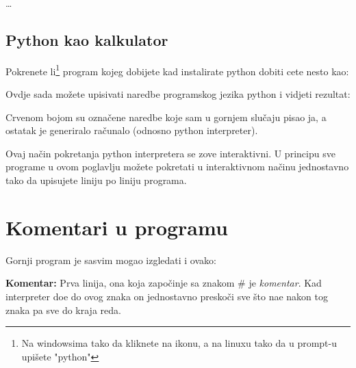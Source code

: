 \dots

\subsection{Python kao kalkulator}

Pokrenete li\footnote{Na windowsima tako da kliknete na ikonu, a
na linuxu tako da u prompt-u upi\v{s}ete "python"} program kojeg
dobijete kad instalirate python dobiti cete nesto kao:


Ovdje sada  mo\v{z}ete upisivati naredbe programskog jezika python i
vidjeti rezultat:


Crvenom bojom su ozna\v{c}ene naredbe koje sam u gornjem slu\v{c}aju
pisao ja, a ostatak je generiralo ra\v{c}unalo (odnosno python
interpreter).

Ovaj na\v{c}in pokretanja python interpretera se zove interaktivni. U
principu sve programe u ovom poglavlju mo\v{z}ete pokretati u interaktivnom
na\v{c}inu jednostavno tako da upisujete liniju po liniju programa.

\section{Komentari u programu}

	Gornji program je sasvim mogao izgledati i ovako:


	\textbf{Komentar:}
	Prva linija, ona koja zapo\v{c}inje sa znakom \# je \emph{komentar}.
	Kad interpreter do\dj{}e do ovog znaka on jednostavno presko\v{c}i sve
	\v{s}to na\dj{}e nakon tog znaka pa sve do kraja reda.

